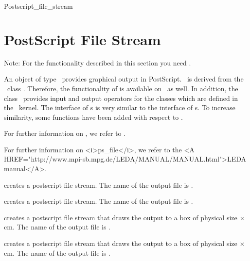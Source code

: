\ccSetTwoColumns{}{\hspace*{8.5cm}}

\medskip
\begin{ccClass} {Postscript_file_stream}
\section{PostScript File Stream}

Note: For the functionality described in this section you need \leda.

\ccDefinition 
An object of type \ccClassName\ provides graphical output in PostScript.
\ccClassName\ is derived from the \leda\ class .
Therefore, the functionality of  is available on \ccClassName\ as well.
In addition, the class \ccClassName\ provides input and output 
operators for the classes which are defined in the \cgal\ kernel.
The interface of \ccClassName s is very similar to the interface of s. 
To increase similarity, some functions have been added with respect to .
\begin{ccTexOnly}
For further information on , we refer to \cite{mnsu-lum}.
\end{ccTexOnly}
\begin{ccHtmlOnly}
For further information on <i>ps_file</i>, we refer to the 
<A HREF="http://www.mpi-sb.mpg.de/LEDA/MANUAL/MANUAL.html">LEDA manual</A>.
\end{ccHtmlOnly}


\ccCreation
{}

{creates a postscript file stream. The name of the output file is
 .}

{creates a postscript file stream. The name of the output file is
 .}

{creates a postscript file stream that draws the output to a box
of physical size  $\times$  cm.
The name of the output file is  .}

{creates a postscript file stream that draws the output to a box
of physical size  $\times$  cm.
The name of the output file is  .}



\end{ccClass}
